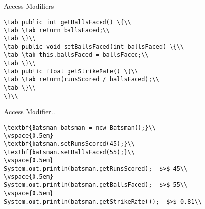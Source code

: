 \documentclass[aspectratio=169,14pt,usenames,dvipsnames]{beamer}
\newcommand\tab[1][1cm]{\hspace*{#1}}
\begin{document}
\begin{frame}{Access Modifiers}
\begin{lstlisting}
\tab public int getBallsFaced() \{\\
\tab \tab return ballsFaced;\\
\tab \}\\
\tab public void setBallsFaced(int ballsFaced) \{\\
\tab \tab this.ballsFaced = ballsFaced;\\
\tab \}\\
\tab public float getStrikeRate() \{\\
\tab \tab return(runsScored / ballsFaced);\\
\tab \}\\
\}\\
\end{lstlisting}
\end{frame}




\begin{frame}{Access Modifier..}
\begin{lstlisting}
\textbf{Batsman batsman = new Batsman();}\\
\vspace{0.5em}
\textbf{batsman.setRunsScored(45);}\\
\textbf{batsman.setBallsFaced(55);}\\
\vspace{0.5em}
System.out.println(batsman.getRunsScored);--$>$ 45\\
\vspace{0.5em}
System.out.println(batsman.getBallsFaced);--$>$ 55\\
\vspace{0.5em}
System.out.println(batsman.getStrikeRate());--$>$ 0.81\\
\end{lstlisting}
\end{frame}
\end{document}
